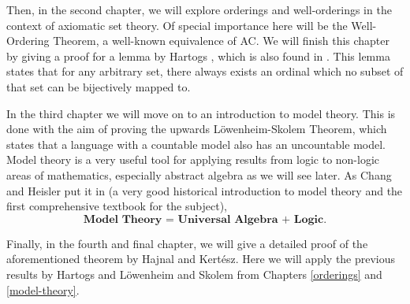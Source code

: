 \documentclass[../../main.tex]{subfiles}
\begin{document}
Then, in the second chapter, we will explore orderings and well-orderings in the context of axiomatic set theory.
Of special importance here will be the Well-Ordering Theorem, a well-known equivalence of AC.
We will finish this chapter by giving a proof for a lemma by Hartogs \cite{Har15}, which is also found in \cite{Haj72}.
This lemma states that for any arbitrary set, there always exists an ordinal which no subset of that set can be bijectively mapped to.

In the third chapter we will move on to an introduction to model theory. 
This is done with the aim of proving the upwards Löwenheim-Skolem Theorem, which states that a language with a countable model also has an uncountable model.
Model theory is a very useful tool for applying results from logic to non-logic areas of mathematics, especially abstract algebra as we will see later.
As Chang and Heisler put it in \cite{Cha90} (a very good historical introduction to model theory and the first comprehensive textbook for the subject), 
$$\textbf{Model Theory = Universal Algebra + Logic}.$$

Finally, in the fourth and final chapter, we will give a detailed proof of the aforementioned theorem by Hajnal and Kertész.
Here we will apply the previous results by Hartogs and Löwenheim and Skolem from Chapters \ref{orderings} and \ref{model-theory}.
\end{document}
